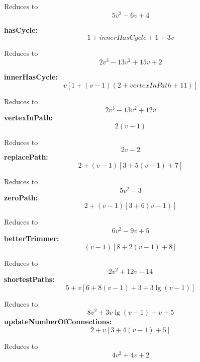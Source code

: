 \documentclass[12pt]{article}
\begin{document}
Reduces to
$$
5v^2 - 6v + 4
$$

\textbf{hasCycle:}
\begin{dmath*}
1 + innerHasCycle + 1 + 3v
\end{dmath*}

Reduces to
$$
2v^3 - 13v^2 + 15v + 2
$$

\textbf{innerHasCycle:}
\begin{dmath*}
v
\left[1 + (v - 1)
    \left(
        2 + vertexInPath + 11
    \right)
\right]
\end{dmath*}

Reduces to
$$
2v^3 - 13v^2 + 12v
$$
\textbf{vertexInPath:}
\begin{dmath*}
2(v - 1)
\end{dmath*}

Reduces to
$$
2v - 2
$$
\textbf{replacePath:}
\begin{dmath*}
2 + (v - 1)
\left[
    3 + 5(v - 1) + 7
\right]
\end{dmath*}

Reduces to
$$
5v^2 - 3
$$
\textbf{zeroPath:}
\begin{dmath*}
2 + 
(v - 1)
\left[
    3 + 6(v - 1)
\right]
\end{dmath*}

Reduces to
$$
6v^2 - 9v + 5
$$
\textbf{betterTrimmer:}
\begin{dmath*}
(v - 1)
\left[
    8 + 2(v - 1) + 8
\right] 
\end{dmath*}

Reduces to
$$
2v^2 + 12v - 14
$$
\textbf{shortestPaths:}
\begin{dmath*}
5 + v
\left[
    6 + 8(v - 1) + 3 + 3\lg(v - 1)
\right]
\end{dmath*}

Reduces to
$$
8v^2 + 3v\lg(v - 1) + v + 5
$$
%
\textbf{updateNumberOfConnections:}
\begin{dmath*}
2 + v
\left[
3 + 4(v - 1) + 5
\right]
\end{dmath*}

Reduces to
$$
4v^2 + 4v + 2
$$
\end{document}
